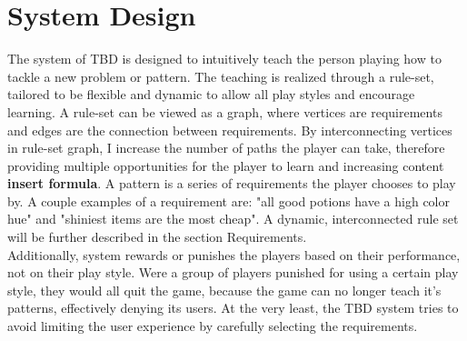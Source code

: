 \documentclass[a4paper,11pt]{article}
\begin{document}
\section{System Design}
\indent The system of TBD is designed to intuitively teach the person playing how to tackle a new problem or pattern. The teaching is realized through a rule-set, tailored to be flexible and dynamic to allow all play styles and encourage learning. A rule-set can be viewed as a graph, where vertices are requirements and edges are the connection between requirements. By interconnecting vertices in rule-set graph, I increase the number of paths the player can take, therefore providing multiple opportunities for the player to learn and increasing content \textbf{insert formula}. A pattern is a series of requirements the player chooses to play by. A couple examples of a requirement are: "all good potions have a high color hue" and "shiniest items are the most cheap". A dynamic, interconnected rule set will be further described in the section Requirements.\\
\indent Additionally, system rewards or punishes the players based on their performance, not on their play style. Were a group of players punished for using a certain play style, they would all quit the game, because the game can no longer teach it's patterns, effectively denying its users. At the very least, the TBD system tries to avoid limiting the user experience by carefully selecting the requirements.
\end{document}

